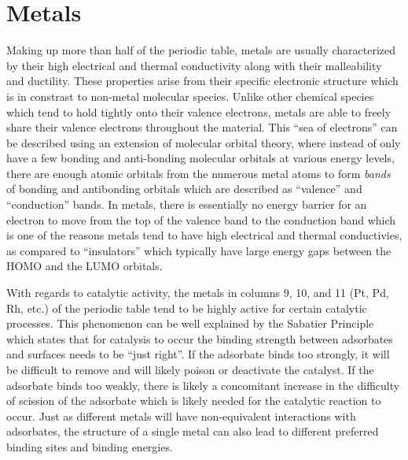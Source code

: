 \section{Metals}
Making up more than half of the periodic table, metals are usually
characterized by their high electrical and thermal conductivity along with
their malleability and ductility. These properties arise from their specific
electronic structure which is in constrast to non-metal molecular
species. Unlike other chemical species which tend to hold tightly onto their
valence electrons, metals are able to freely share their valence electrons
throughout the material.  This ``sea of electrons'' can be described using an
extension of molecular orbital theory, where instead of only have a few bonding
and anti-bonding molecular orbitals at various energy levels, there are enough
atomic orbitals from the numerous metal atoms to form {\em bands} of bonding
and antibonding orbitals which are described as ``valence'' and ``conduction''
bands. In metals, there is essentially no energy barrier for an electron to
move from the top of the valence band to the conduction band which is one of
the reasons metals tend to have high electrical and thermal conductivies, as
compared to ``insulators'' which typically have large energy gaps between the
HOMO and the LUMO orbitals.


With regards to catalytic activity, the metals in columns 9, 10, and 11 (Pt,
Pd, Rh, etc.) of the periodic table tend to be highly active for certain
catalytic processes. This phenomenon can be well explained by the Sabatier
Principle which states that for catalysis to occur the binding strength between
adsorbates and surfaces needs to be ``just right''. If the adsorbate binds too
strongly, it will be difficult to remove and will likely poison or deactivate
the catalyst. If the adsorbate binds too weakly, there is likely a concomitant
increase in the difficulty of scission of the adsorbate which is likely needed
for the catalytic reaction to occur. Just as different metals will have
non-equivalent interactions with adsorbates, the structure of a single metal
can also lead to different preferred binding sites and binding energies.



